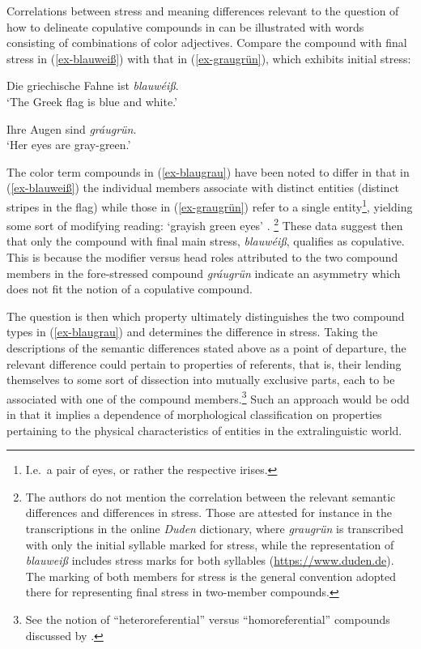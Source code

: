 \documentclass[output=paper
 ,nobabel
 ,draftmode
 ,colorlinks, citecolor=brown
]{langscibook}
\begin{document}
Correlations between stress and meaning differences relevant to the question of how to delineate copulative compounds in  can be illustrated with words consisting of combinations of color adjectives. Compare the compound with final stress in (\ref{ex-blauweiß}) with that in  (\ref{ex-graugrün}), which exhibits initial stress:

\eal\label{ex-blaugrau}
\ex\label{ex-blauweiß}
Die griechische Fahne ist \emph{blauwéiß}. \\
`The Greek flag is blue and white.'

\ex\label{ex-graugrün}
Ihre Augen sind \emph{gráugrün}.\\
`Her eyes are gray-green.'
\zl

\noindent
The color term compounds in (\ref{ex-blaugrau}) have been noted to differ in that in (\ref{ex-blauweiß}) the individual members associate with distinct entities (\eg distinct stripes in the flag) while those in (\ref{ex-graugrün}) refer to a single entity\footnote{I.e.\ a pair of eyes, or rather the respective irises.}, yielding some sort of modifying reading:
`grayish green eyes' \citep[44]{Puempeletal1992}.%
%
\footnote{The authors do not mention the correlation between the relevant semantic differences and differences in stress. Those are attested for instance in the transcriptions in the online \emph{Duden} dictionary, where \emph{graugrün} is transcribed with only the initial syllable marked for stress, while the representation of \emph{blauweiß} includes stress marks for both syllables (\url{https://www.duden.de}). The marking of both members for stress is the general convention adopted there for representing final stress in two-member compounds.} 
These data suggest then that only the compound with final main stress, \emph{blauwéiß}, qualifies as
copulative. This is because the modifier versus head roles attributed to the two compound members in
the fore-stressed compound \emph{gráugrün} indicate an asymmetry which does not fit the notion of a
copulative compound.  

The question is then which property ultimately distinguishes the two compound types in (\ref{ex-blaugrau}) and determines the difference in stress. Taking the descriptions of the semantic differences stated above as a point of departure, the relevant difference could pertain to properties of referents, that is, their lending themselves to some sort of dissection into mutually exclusive parts, each to be associated with one of the compound members.\footnote{See the notion of ``heteroreferential'' versus ``homoreferential'' compounds discussed by \citet[608]{Renner2008}.} Such an approach would be odd in that  it implies a dependence of morphological classification on properties pertaining to the physical characteristics of entities in the extralinguistic world.
 
\end{document}
